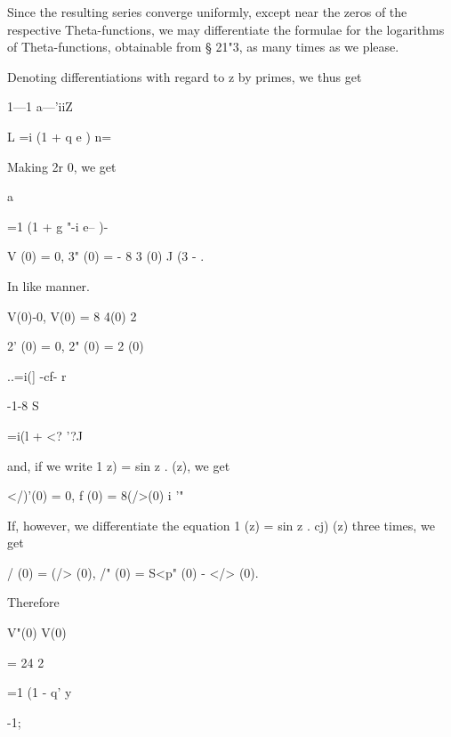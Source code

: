 Since the resulting series converge uniformly, except near the zeros
of the respective Theta-functions, we may differentiate the formulae
for the logarithms of Theta-functions, obtainable from § 21"3, as many
times as we please.

Denoting differentiations with regard to z by primes, we thus get






1—1 a—'iiZ






L =i (1 + q e ) n=\

Making 2r 0, we get



a%



=1 (1 + g "-i e-- )-



V (0) = 0, 3" (0) = - 8 3 (0) J (3 - .



In like manner.



V(0)-0, V(0) = 8 4(0) 2



 2' (0) = 0, 2" (0) = 2 (0)



..=i(] -cf- r



-1-8 S



 =i(l + <? '?J



and, if we write 1 z) = sin z . (z), we get

</)'(0) = 0, f (0) = 8(/>(0) i '"

If, however, we differentiate the equation 1 (z) = sin z . cj) (z)
three times, we get



 / (0) = (/> (0), /" (0) = S<p" (0) - </> (0).



Therefore



V"(0) V(0)



= 24 2



=1 (1 - q' y



-1;



